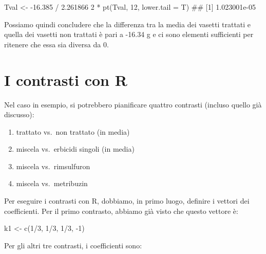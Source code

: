 \documentclass[a4paper,12pt,oneside]{book}
\providecommand{\tightlist}{%
  \setlength{\itemsep}{0pt}\setlength{\parskip}{0pt}}
\newenvironment{Shaded}{\begin{snugshade}}{\end{snugshade}}
\newcommand{\DecValTok}[1]{#1}
\newcommand{\FloatTok}[1]{#1}
\newcommand{\SpecialCharTok}[1]{#1}
\newcommand{\DocumentationTok}[1]{#1}
\newcommand{\OtherTok}[1]{#1}
\newcommand{\FunctionTok}[1]{#1}
\newcommand{\AttributeTok}[1]{#1}
\newcommand{\NormalTok}[1]{#1}
\begin{document}
\begin{Shaded}
\begin{Highlighting}[]
\NormalTok{Tval }\OtherTok{\textless{}{-}} \SpecialCharTok{{-}}\FloatTok{16.385} \SpecialCharTok{/} \FloatTok{2.261866}
\DecValTok{2} \SpecialCharTok{*} \FunctionTok{pt}\NormalTok{(Tval, }\DecValTok{12}\NormalTok{, }\AttributeTok{lower.tail =}\NormalTok{ T)}
\DocumentationTok{\#\# [1] 1.023001e{-}05}
\end{Highlighting}
\end{Shaded}

Possiamo quindi concludere che la differenza tra la media dei vasetti trattati e quella dei vasetti non trattati è pari a -16.34 g e ci sono elementi sufficienti per ritenere che essa sia diversa da 0.

\hypertarget{i-contrasti-con-r}{%
\section{I contrasti con R}\label{i-contrasti-con-r}}

Nel caso in esempio, si potrebbero pianificare quattro contrasti (incluso quello già discusso):

\begin{enumerate}
\def\labelenumi{\arabic{enumi}.}
\tightlist
\item
  trattato vs.~non trattato (in media)
\item
  miscela vs.~erbicidi singoli (in media)
\item
  miscela vs.~rimsulfuron
\item
  miscela vs.~metribuzin
\end{enumerate}

Per eseguire i contrasti con R, dobbiamo, in primo luogo, definire i vettori dei coefficienti. Per il primo contrasto, abbiamo già visto che questo vettore è:

\begin{Shaded}
\begin{Highlighting}[]
\NormalTok{k1 }\OtherTok{\textless{}{-}} \FunctionTok{c}\NormalTok{(}\DecValTok{1}\SpecialCharTok{/}\DecValTok{3}\NormalTok{, }\DecValTok{1}\SpecialCharTok{/}\DecValTok{3}\NormalTok{, }\DecValTok{1}\SpecialCharTok{/}\DecValTok{3}\NormalTok{, }\SpecialCharTok{{-}}\DecValTok{1}\NormalTok{)}
\end{Highlighting}
\end{Shaded}

Per gli altri tre contrasti, i coefficienti sono:
\end{document}
